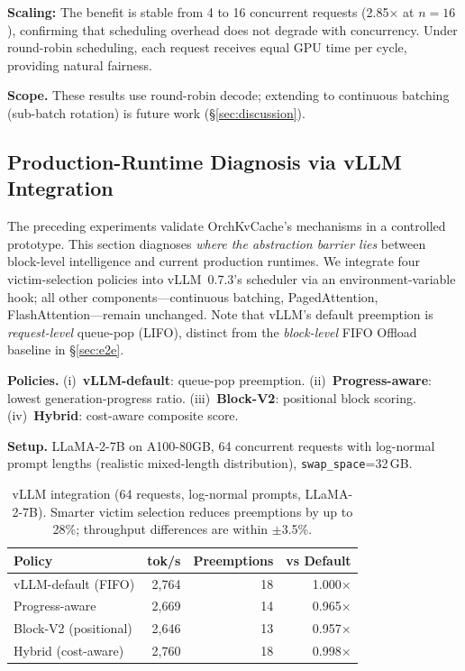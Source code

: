 \documentclass[conference]{IEEEtran}
\begin{document}
\textbf{Scaling:} The benefit is stable from 4 to 16 concurrent requests (2.85$\times$ at $n{=}16$), confirming that scheduling overhead does not degrade with concurrency. Under round-robin scheduling, each request receives equal GPU time per cycle, providing natural fairness.

\textbf{Scope.} These results use round-robin decode; extending to continuous batching (sub-batch rotation) is future work (\S\ref{sec:discussion}).

\subsection{Production-Runtime Diagnosis via vLLM Integration}
\label{sec:vllm-integration}

The preceding experiments validate OrchKvCache's mechanisms in a controlled prototype. This section diagnoses \emph{where the abstraction barrier lies} between block-level intelligence and current production runtimes. We integrate four victim-selection policies into vLLM~0.7.3's scheduler via an environment-variable hook; all other components---continuous batching, PagedAttention, FlashAttention---remain unchanged. Note that vLLM's default preemption is \emph{request-level} queue-pop (LIFO), distinct from the \emph{block-level} FIFO Offload baseline in \S\ref{sec:e2e}.

\textbf{Policies.} (i)~\textbf{vLLM-default}: queue-pop preemption. (ii)~\textbf{Progress-aware}: lowest generation-progress ratio. (iii)~\textbf{Block-V2}: positional block scoring. (iv)~\textbf{Hybrid}: cost-aware composite score.

\textbf{Setup.} LLaMA-2-7B on A100-80GB, 64 concurrent requests with log-normal prompt lengths (realistic mixed-length distribution), \texttt{swap\_space}=32\,GB.

\begin{table}[t]
\centering
\caption{vLLM integration (64 requests, log-normal prompts, LLaMA-2-7B). Smarter victim selection reduces preemptions by up to 28\%; throughput differences are within $\pm$3.5\%.}
\label{tab:vllm-realistic}
\small
\setlength{\tabcolsep}{8pt}
\begin{tabular}{@{}lrrr@{}}
\toprule
Policy & tok/s & Preemptions & vs Default \\
\midrule
vLLM-default (FIFO)    & 2{,}764 & 18 & 1.000$\times$ \\
Progress-aware          & 2{,}669 & 14 & 0.965$\times$ \\
Block-V2 (positional)   & 2{,}646 & 13 & 0.957$\times$ \\
Hybrid (cost-aware)     & 2{,}760 & 18 & 0.998$\times$ \\
\bottomrule
\end{tabular}
\end{table}
\end{document}
